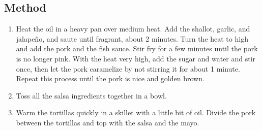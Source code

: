 \subsection{Method}

\begin{enumerate}
    \item Heat the oil in a heavy pan over medium heat. Add the shallot, garlic, and jalapeño, and saute until fragrant, about 2 minutes. Turn the heat to high and add the pork and the fish sauce. Stir fry for a few minutes until the pork is no longer pink. With the heat very high, add the sugar and water and stir once, then let the pork caramelize by not stirring it for about 1 minute. Repeat this process until the pork is nice and golden brown.
    \item Toss all the salsa ingredients together in a bowl.
    \item Warm the tortillas quickly in a skillet with a little bit of oil. Divide the pork between the tortillas and top with the salsa and the mayo.
\end{enumerate}
